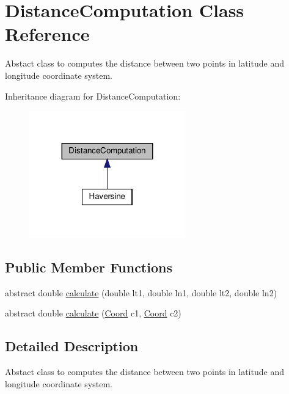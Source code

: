 \hypertarget{classDistanceComputation}{}\section{Distance\+Computation Class Reference}
\label{classDistanceComputation}


Abstact class to computes the distance between two points in latitude and longitude coordinate system.  




Inheritance diagram for Distance\+Computation\+:\nopagebreak
\begin{figure}[H]
\begin{center}
\leavevmode
\includegraphics[width=191pt]{classDistanceComputation__inherit__graph}
\end{center}
\end{figure}
\subsection*{Public Member Functions}
\begin{DoxyCompactItemize}
\item 
abstract double \hyperlink{classDistanceComputation_a846f5563a7add26c3fb4bbb988ac24ca}{calculate} (double lt1, double ln1, double lt2, double ln2)
\item 
abstract double \hyperlink{classDistanceComputation_ad735d72f479e7114a528b3404ea83a33}{calculate} (\hyperlink{structCoord}{Coord} c1, \hyperlink{structCoord}{Coord} c2)
\end{DoxyCompactItemize}


\subsection{Detailed Description}
Abstact class to computes the distance between two points in latitude and longitude coordinate system. 



